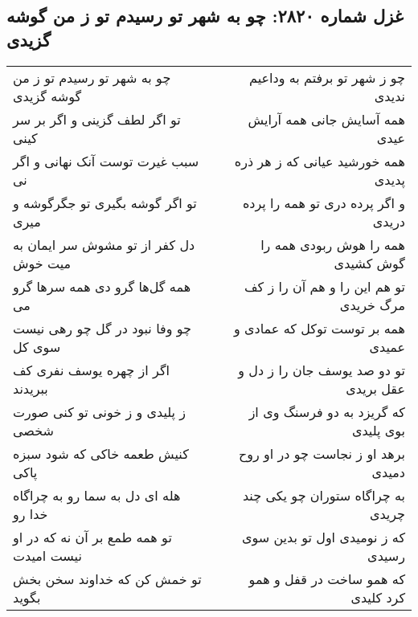 \begin{center}
\section*{غزل شماره ۲۸۲۰: چو به شهر تو رسیدم تو ز من گوشه گزیدی}
\label{sec:2820}
\begin{longtable}{l p{0.5cm} r}
چو به شهر تو رسیدم تو ز من گوشه گزیدی
&&
چو ز شهر تو برفتم به وداعیم ندیدی
\\
تو اگر لطف گزینی و اگر بر سر کینی
&&
همه آسایش جانی همه آرایش عیدی
\\
سبب غیرت توست آنک نهانی و اگر نی
&&
همه خورشید عیانی که ز هر ذره پدیدی
\\
تو اگر گوشه بگیری تو جگرگوشه و میری
&&
و اگر پرده دری تو همه را پرده دریدی
\\
دل کفر از تو مشوش سر ایمان به میت خوش
&&
همه را هوش ربودی همه را گوش کشیدی
\\
همه گل‌ها گرو دی همه سرها گرو می
&&
تو هم این را و هم آن را ز کف مرگ خریدی
\\
چو وفا نبود در گل چو رهی نیست سوی کل
&&
همه بر توست توکل که عمادی و عمیدی
\\
اگر از چهره یوسف نفری کف ببریدند
&&
تو دو صد یوسف جان را ز دل و عقل بریدی
\\
ز پلیدی و ز خونی تو کنی صورت شخصی
&&
که گریزد به دو فرسنگ وی از بوی پلیدی
\\
کنیش طعمه خاکی که شود سبزه پاکی
&&
برهد او ز نجاست چو در او روح دمیدی
\\
هله ای دل به سما رو به چراگاه خدا رو
&&
به چراگاه ستوران چو یکی چند چریدی
\\
تو همه طمع بر آن نه که در او نیست امیدت
&&
که ز نومیدی اول تو بدین سوی رسیدی
\\
تو خمش کن که خداوند سخن بخش بگوید
&&
که همو ساخت در قفل و همو کرد کلیدی
\\
\end{longtable}
\end{center}
